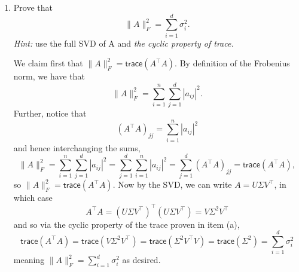 \documentclass{../../../kin_math}
\begin{document}
\begin{questions}
\begin{enumerate}
    \item Prove that
    \begin{equation}
      \lVert A \rVert_F^2 = \sum_{i = 1}^d \sigma_i^2.
    \end{equation}
    \emph{Hint:} use the full SVD of A and \emph{the cyclic property of trace.}
    \begin{solution}
      We claim first that $\lVert A \rVert_F^2 = \textsf{trace}(A^\top A)$. By definition of the Frobenius norm, we have that
      \begin{equation*}
        \lVert A \rVert_F^2 = \sum_{i = 1}^n \sum_{j = 1}^d |a_{ij}|^2.
      \end{equation*}
      Further, notice that
      \begin{equation*}
        (A^\top A)_{jj} = \sum_{i = 1}^{n} |a_{ij}|^2
      \end{equation*}
      and hence interchanging the sums,
      \begin{equation*}
        \lVert A \rVert_F^2 = \sum_{i = 1}^n \sum_{j = 1}^d |a_{ij}|^2 = \sum_{j = 1}^d \sum_{i = 1}^n |a_{ij}|^2 = \sum_{j = 1}^d (A^\top A)_{jj} = \textsf{trace}(A^\top A),
      \end{equation*}
      so $\lVert A \rVert_F^2 = \textsf{trace}(A^\top A)$. Now by the SVD, we can write $A = U \Sigma V^\top$, in which case
      \begin{equation*}
        A^\top A = (U \Sigma V^\top)^\top (U \Sigma V^\top) = V \Sigma^2 V^\top
      \end{equation*}
      and so via the cyclic property of the trace proven in item (a),
      \begin{equation*}
        \textsf{trace}(A^\top A) = \textsf{trace}(V \Sigma^2 V^\top) = \textsf{trace}(\Sigma^2 V^\top V) = \textsf{trace}(\Sigma^2) = \sum_{i = 1}^d \sigma_i^2
      \end{equation*}
      meaning $\lVert A \rVert_F^2 = \sum_{i = 1}^d \sigma_i^2$ as desired.
    \end{solution}


\end{enumerate}
\end{questions}
\end{document}
